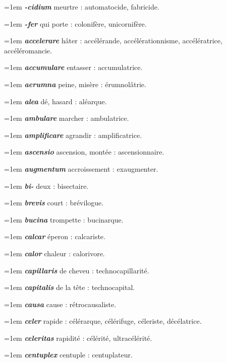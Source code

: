 \hangindent=1em \textbf{\textit{-cidium}} meurtre : automatocide, fabricide.\par
\hangindent=1em \textbf{\textit{-fer}} qui porte : colonifère, unicornifère.\par
\hangindent=1em \textbf{\textit{accelerare}} hâter : accélérande, accélérationnisme, accélératrice, accéléromancie.\par
\hangindent=1em \textbf{\textit{accumulare}} entasser : accumulatrice.\par
\hangindent=1em \textbf{\textit{aerumna}} peine, misère : érumnolâtrie.\par
\hangindent=1em \textbf{\textit{alea}} dé, hasard : aléarque.\par
\hangindent=1em \textbf{\textit{ambulare}} marcher : ambulatrice.\par
\hangindent=1em \textbf{\textit{amplificare}} agrandir : amplificatrice.\par
\hangindent=1em \textbf{\textit{ascensio}} ascension, montée : ascensionnaire.\par
\hangindent=1em \textbf{\textit{augmentum}} accroissement : exaugmenter.\par
\hangindent=1em \textbf{\textit{bi-}} deux : bisectaire.\par
\hangindent=1em \textbf{\textit{brevis}} court : brévilogue.\par
\hangindent=1em \textbf{\textit{bucina}} trompette : bucinarque.\par
\hangindent=1em \textbf{\textit{calcar}} éperon : calcariste.\par
\hangindent=1em \textbf{\textit{calor}} chaleur : calorivore.\par
\hangindent=1em \textbf{\textit{capillaris}} de cheveu : technocapillarité.\par
\hangindent=1em \textbf{\textit{capitalis}} de la tête : technocapital.\par
\hangindent=1em \textbf{\textit{causa}} cause : rétrocausaliste.\par
\hangindent=1em \textbf{\textit{celer}} rapide : célérarque, célérifuge, céleriste, décélatrice.\par
\hangindent=1em \textbf{\textit{celeritas}} rapidité : célérité, ultracélérité.\par
\hangindent=1em \textbf{\textit{centuplex}} centuple : centuplateur.\par
